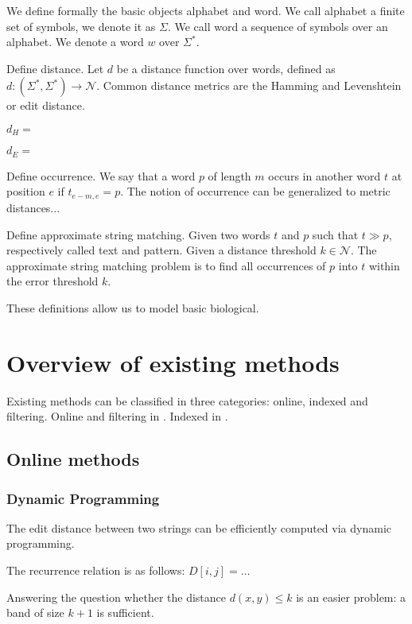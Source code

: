 We define formally the basic objects alphabet and word.
We call alphabet a finite set of symbols, we denote it as $\Sigma$.
We call word a sequence of symbols over an alphabet. We denote a word $w$ over $\Sigma^{*}$.

Define distance.
Let $d$ be a distance function over words, defined as $d : (\Sigma^{*}, \Sigma^{*}) \rightarrow \mathcal{N}$.
Common distance metrics are the Hamming and Levenshtein or edit distance.

$d_H = $

$d_E = $

Define occurrence.
We say that a word $p$ of length $m$ occurs in another word $t$ at position $e$ if $t_{e-m, e} = p$.
The notion of occurrence can be generalized to metric distances...

Define approximate string matching.
Given two words $t$ and $p$ such that $t \gg p$, respectively called text and pattern. Given a distance threshold $k \in \mathcal{N}$.
The approximate string matching problem is to find all occurrences of $p$ into $t$ within the error threshold $k$.

These definitions allow us to model basic biological.



\section{Overview of existing methods}

Existing methods can be classified in three categories: online, indexed and filtering.
Online and filtering in \cite{Navarro1998}. Indexed in \cite{Navarro2001}.


\subsection{Online methods}

\subsubsection{Dynamic Programming}

The edit distance between two strings can be efficiently computed via dynamic programming.

The recurrence relation is as follows: $D[i,j] = \dots$

Answering the question whether the distance $d(x,y) \leq k$ is an easier problem: a band of size $k+1$ is sufficient.

